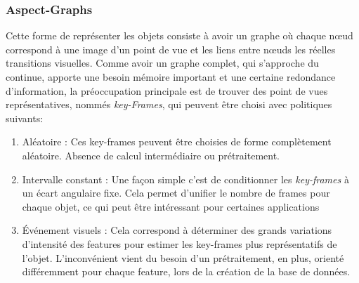 
\subsubsection{Aspect-Graphs}

Cette forme de représenter les objets consiste à avoir un graphe où
chaque nœud correspond à une image d'un point de vue et les liens
entre nœuds les réelles transitions visuelles. Comme avoir un graphe
complet, qui s'approche du continue, apporte une besoin mémoire
important et une certaine redondance d'information, la préoccupation
principale est de trouver des point de vues représentatives, nommés
\textit{key-Frames}, qui peuvent être choisi avec politiques suivants:
\begin{enumerate}
\item Aléatoire : Ces key-frames peuvent être choisies de forme
  complètement aléatoire. Absence de calcul intermédiaire ou
  prétraitement.

\item Intervalle constant : Une façon simple c'est de conditionner les
  \textit{key-frames} à un écart angulaire fixe. Cela permet d'unifier
  le nombre de frames pour chaque objet, ce qui peut être intéressant
  pour certaines applications

\item Événement visuels : Cela correspond à déterminer des grands
  variations d'intensité des features pour estimer les key-frames plus
  représentatifs de l'objet. L'inconvénient vient du besoin d'un
  prétraitement, en plus, orienté différemment pour chaque feature,
  lors de la création de la base de données.

\end{enumerate}



